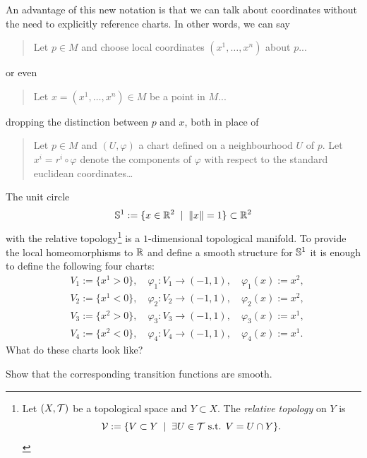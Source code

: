An advantage of this new notation is that we can talk about coordinates without the need to explicitly reference charts. In other words, we can say
\begin{quote}
  Let $p\in M$ and choose local coordinates $(x^1, \ldots, x^n)$ about $p$...
\end{quote}
or even
\begin{quote}
  Let $x=(x^1, \ldots, x^n)\in M$ be a point in $M$...
\end{quote}
dropping the distinction between $p$ and $x$, both in place of
\begin{quote}
  Let $p \in M$ and $(U, \varphi)$ a chart defined on a neighbourhood $U$ of $p$.
  Let $x^i = r^i \circ\varphi$ denote the components of $\varphi$ with respect to the standard euclidean coordinates\ldots
\end{quote}

\begin{example}\label{ex:S1emb}
  The unit circle
  \begin{equation}
    \mathbb{S}^1 := \{x\in\mathbb{R}^2 \;\mid\; \|x\|=1\}\subset\mathbb{R}^2
  \end{equation}
  with the relative topology\footnote{Let $(X,\mathcal{T})$ be a topological space and $Y\subset X$. The \emph{relative topology} on $Y$ is \begin{equation}\mathcal{V}:=\{V\subset Y\;\mid\;\exists U\in\mathcal{T} \mbox{ s.t. } V = U \cap Y\}.\end{equation}} is a $1$-dimensional topological manifold.
  To provide the local homeomorphisms to $\mathbb{R}$ and define a smooth structure for $\mathbb{S}^1$ it is enough to define the following four charts:
  \begin{equation}
    \begin{aligned}
      &V_1 := \{ x^1 > 0 \},\quad \varphi_1: V_1 \to (-1, 1), \quad \varphi_1(x) := x^2,\\
      &V_2 := \{ x^1 < 0 \},\quad \varphi_2: V_2 \to (-1, 1), \quad \varphi_2(x) := x^2,\\
      &V_3 := \{ x^2 > 0 \},\quad \varphi_3: V_3 \to (-1, 1), \quad \varphi_3(x) := x^1,\\
      &V_4 := \{ x^2 < 0 \},\quad \varphi_4: V_4 \to (-1, 1), \quad \varphi_4(x) := x^1.
    \end{aligned}
  \end{equation}
  What do these charts look like?
  \begin{exercise}
    Show that the corresponding transition functions are smooth.
  \end{exercise}
\end{example}

